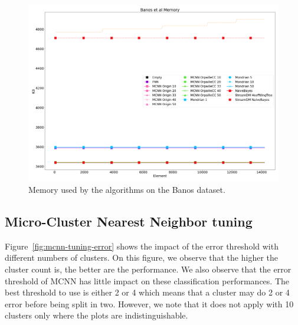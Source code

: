 \begin{figure}[H]
	\includegraphics[width=\linewidth]{figures/results/banos_3_memory.png}
	\caption{Memory used by the algorithms on the Banos dataset.}
	\label{fig:memory}
\end{figure}


\subsection{Micro-Cluster Nearest Neighbor tuning}
Figure~\ref{fig:mcnn-tuning-error} shows the impact of the error threshold with
different numbers of clusters. On this figure, we observe that the higher the
cluster count is, the better are the performance. We also observe that the
error threshold of MCNN has little impact on these classification performances.
The best threshold to use is either 2 or 4 which means that a cluster may do 2
or 4 error before being split in two.
However, we note that it does not apply with 10 clusters only where the
plots are indistinguishable.

